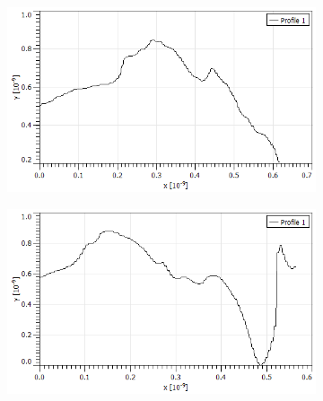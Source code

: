 \begin{figure}[]
    \centering
    \begin{subfigure}{.475\linewidth}
        \includegraphics[width=\linewidth]{Messdaten/Hoehenprofile_unseres/1.png}
    \end{subfigure}\hfill 
    \begin{subfigure}{.475\linewidth}
        \includegraphics[width=\linewidth]{Messdaten/Hoehenprofile_unseres/2.png}
    \end{subfigure}
    \medskip 


\end{figure}
